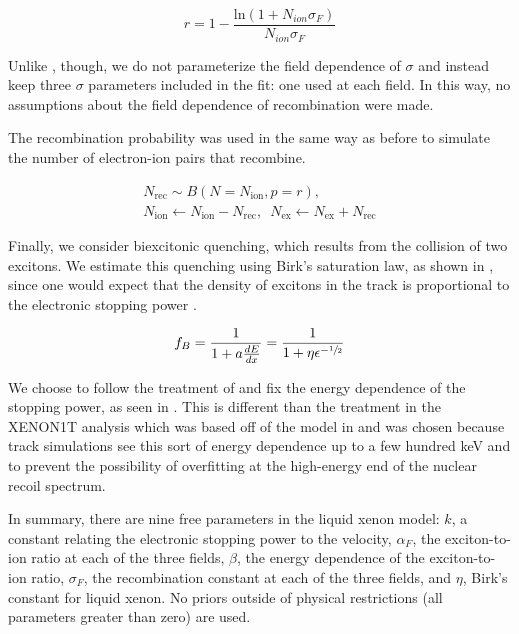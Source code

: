 \begin{equation}
        \label{eqn:nerix_recombination}
        r = 1 - \frac{\textrm{ln}(1 + N_{ion} \sigma_F)}{N_{ion} \sigma_F}
\end{equation}

Unlike , though, we do not parameterize the field dependence of $\sigma$ and instead keep three $\sigma$ parameters included in the fit: one used at each field.  In this way, no assumptions about the field dependence of recombination were made.  

The recombination probability was used in the same way as before to simulate the number of electron-ion pairs that recombine.


\begin{equation}
        \label{eqn:xe1t_nr_recombination}
        \begin{gathered}
                N_{\textrm{rec}} \sim B(N = N_{\textrm{ion}}, p = r), \\ 
                N_{\textrm{ion}} \leftarrow N_{\textrm{ion}} - N_{\textrm{rec}}, \, \, \,  N_{\textrm{ex}} \leftarrow N_{\textrm{ex}} + N_{\textrm{rec}}
        \end{gathered}
\end{equation}


Finally, we consider biexcitonic quenching, which results from the collision of two excitons.  We estimate this quenching using Birk's saturation law, as shown in , since one would expect that the density of excitons in the track is proportional to the electronic stopping power \cite{mei2008model, tretyak2010semi, bezrukov2011interplay}.


\begin{equation}
        \label{eqn:nerix_birks_quenching}
        f_B = \frac{1}{1 + a \frac{dE}{dx}} = \frac{1}{1 + \eta \epsilon^{- \sfrac{1}{2}}}
\end{equation}


We choose to follow the treatment of  and fix the energy dependence of the stopping power, as seen in .  This is different than the treatment in the XENON1T analysis which was based off of the model in  and was chosen because track simulations see this sort of energy dependence up to a few hundred keV and to prevent the possibility of overfitting at the high-energy end of the nuclear recoil spectrum.

In summary, there are nine free parameters in the liquid xenon model: $k$, a constant relating the electronic stopping power to the velocity, $\alpha_F$, the exciton-to-ion ratio at each of the three fields, $\beta$, the energy dependence of the exciton-to-ion ratio, $\sigma_F$, the recombination constant at each of the three fields, and $\eta$, Birk's constant for liquid xenon.  No priors outside of physical restrictions (all parameters greater than zero) are used.



